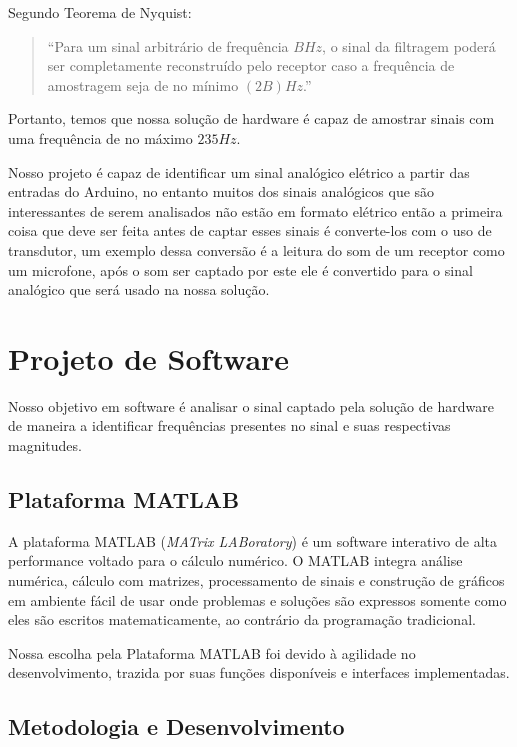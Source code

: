\documentclass[12pt,a4paper]{report}
\begin{document}
Segundo Teorema de Nyquist:

\begin{quotation}
“Para um sinal arbitrário de frequência \(B Hz\), o sinal da filtragem poderá ser completamente reconstruído pelo receptor caso a frequência de amostragem seja de no mínimo \((2B) Hz\).”
\end{quotation}

Portanto, temos que nossa solução de hardware é capaz de amostrar sinais com uma frequência de no máximo \(235Hz\).

Nosso projeto é capaz de identificar um sinal analógico elétrico a partir das entradas do Arduino, no entanto muitos dos sinais analógicos que são interessantes de serem analisados não estão em formato elétrico então a primeira coisa que deve ser feita antes de captar esses sinais é converte-los com o uso de transdutor, um exemplo dessa conversão é a leitura do som de um receptor como um microfone, após o som ser captado por este ele é convertido para o sinal analógico que será usado na nossa solução.



\chapter{Projeto de Software}

Nosso objetivo em software é analisar o sinal captado pela solução de hardware de maneira a identificar frequências presentes no sinal e suas respectivas magnitudes.

\section{Plataforma MATLAB}

A plataforma MATLAB (\textit{MATrix LABoratory}) é um software interativo de alta performance voltado para o cálculo numérico. O MATLAB integra análise numérica, cálculo com matrizes, processamento de sinais e construção de gráficos em ambiente fácil de usar onde problemas e soluções são expressos somente como eles são escritos matematicamente, ao contrário da programação tradicional.

Nossa escolha pela Plataforma MATLAB foi devido à agilidade no desenvolvimento, trazida por suas funções disponíveis e interfaces implementadas.

\section{Metodologia e Desenvolvimento}
\end{document}
